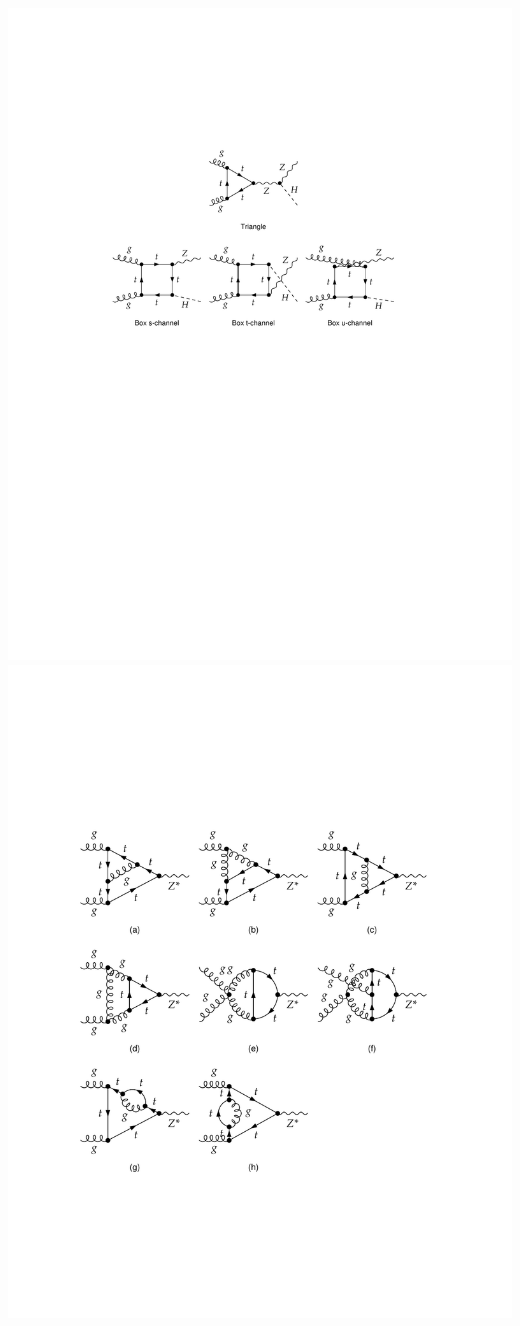 \documentclass[12pt]{article}
\begin{document}
 \begin{minipage}{ 0.25\linewidth}
	\begin{center}
		\includegraphics[width=1\textwidth]{1loop} \\
		\includegraphics[width=1.2\textwidth]{2loop} 

\end{center}
\end{minipage}
\end{document}
